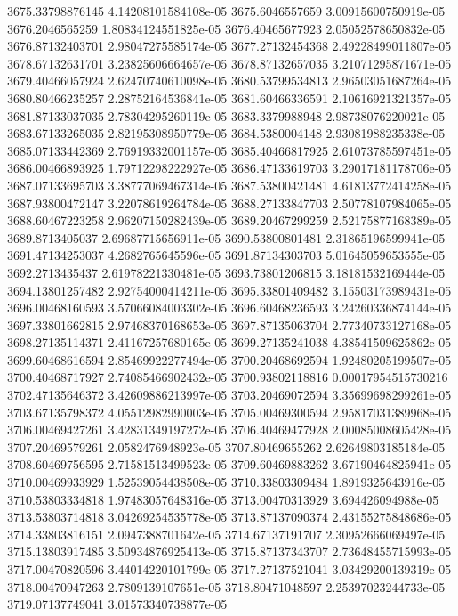 {3675.33798876145 4.14208101584108e-05
3675.6046557659 3.00915600750919e-05
3676.2046565259 1.80834124551825e-05
3676.40465677923 2.05052578650832e-05
3676.87132403701 2.98047275585174e-05
3677.27132454368 2.49228499011807e-05
3678.67132631701 3.23825606664657e-05
3678.87132657035 3.21071295871671e-05
3679.40466057924 2.62470740610098e-05
3680.53799534813 2.96503051687264e-05
3680.80466235257 2.28752164536841e-05
3681.60466336591 2.10616921321357e-05
3681.87133037035 2.78304295260119e-05
3683.3379988948 2.98738076220021e-05
3683.67133265035 2.82195308950779e-05
3684.5380004148 2.93081988235338e-05
3685.07133442369 2.76919332001157e-05
3685.40466817925 2.61073785597451e-05
3686.00466893925 1.79712298222927e-05
3686.47133619703 3.29017181178706e-05
3687.07133695703 3.38777069467314e-05
3687.53800421481 4.61813772414258e-05
3687.93800472147 3.22078619264784e-05
3688.27133847703 2.50778107984065e-05
3688.60467223258 2.96207150282439e-05
3689.20467299259 2.52175877168389e-05
3689.8713405037 2.69687715656911e-05
3690.53800801481 2.31865196599941e-05
3691.47134253037 4.2682765645596e-05
3691.87134303703 5.01645059653555e-05
3692.2713435437 2.61978221330481e-05
3693.73801206815 3.18181532169444e-05
3694.13801257482 2.92754000414211e-05
3695.33801409482 3.15503173989431e-05
3696.00468160593 3.57066084003302e-05
3696.60468236593 3.24260336874144e-05
3697.33801662815 2.97468370168653e-05
3697.87135063704 2.77340733127168e-05
3698.27135114371 2.41167257680165e-05
3699.27135241038 4.38541509625862e-05
3699.60468616594 2.85469922277494e-05
3700.20468692594 1.92480205199507e-05
3700.40468717927 2.74085466902432e-05
3700.93802118816 0.00017954515730216
3702.47135646372 3.42609886213997e-05
3703.20469072594 3.35699698299261e-05
3703.67135798372 4.05512982990003e-05
3705.00469300594 2.95817031389968e-05
3706.00469427261 3.42831349197272e-05
3706.40469477928 2.00085008605428e-05
3707.20469579261 2.0582476948923e-05
3707.80469655262 2.62649803185184e-05
3708.60469756595 2.71581513499523e-05
3709.60469883262 3.67190464825941e-05
3710.00469933929 1.52539054438508e-05
3710.33803309484 1.8919325643916e-05
3710.53803334818 1.97483057648316e-05
3713.00470313929 3.694426094988e-05
3713.53803714818 3.04269254535778e-05
3713.87137090374 2.43155275848686e-05
3714.33803816151 2.0947388701642e-05
3714.67137191707 2.30952666069497e-05
3715.13803917485 3.50934876925413e-05
3715.87137343707 2.73648455715993e-05
3717.00470820596 3.44014220101799e-05
3717.27137521041 3.03429200139319e-05
3718.00470947263 2.7809139107651e-05
3718.80471048597 2.25397023244733e-05
3719.07137749041 3.01573340738877e-05
}
